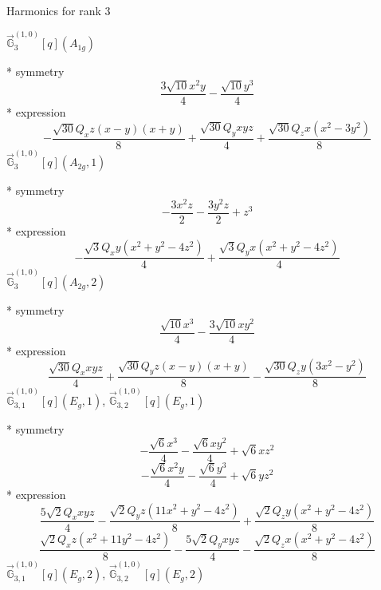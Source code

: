 \documentclass[fleqn,8pt]{jsarticle}
\begin{document}
\noindent * Harmonics for rank 3

\noindent\quad $\vec{\mathbb{G}}_{3}^{(1,0)}[q](A_{1g})$

\noindent\quad ** symmetry
\begin{dmath*}
\frac{3 \sqrt{10} x^{2} y}{4} - \frac{\sqrt{10} y^{3}}{4}
\end{dmath*}
\noindent\quad ** expression
\begin{dmath*}
- \frac{\sqrt{30} Q_{x} z \left(x - y\right) \left(x + y\right)}{8} + \frac{\sqrt{30} Q_{y} x y z}{4} + \frac{\sqrt{30} Q_{z} x \left(x^{2} - 3 y^{2}\right)}{8}
\end{dmath*}
\noindent\quad $\vec{\mathbb{G}}_{3}^{(1,0)}[q](A_{2g},1)$

\noindent\quad ** symmetry
\begin{dmath*}
- \frac{3 x^{2} z}{2} - \frac{3 y^{2} z}{2} + z^{3}
\end{dmath*}
\noindent\quad ** expression
\begin{dmath*}
- \frac{\sqrt{3} Q_{x} y \left(x^{2} + y^{2} - 4 z^{2}\right)}{4} + \frac{\sqrt{3} Q_{y} x \left(x^{2} + y^{2} - 4 z^{2}\right)}{4}
\end{dmath*}
\noindent\quad $\vec{\mathbb{G}}_{3}^{(1,0)}[q](A_{2g},2)$

\noindent\quad ** symmetry
\begin{dmath*}
\frac{\sqrt{10} x^{3}}{4} - \frac{3 \sqrt{10} x y^{2}}{4}
\end{dmath*}
\noindent\quad ** expression
\begin{dmath*}
\frac{\sqrt{30} Q_{x} x y z}{4} + \frac{\sqrt{30} Q_{y} z \left(x - y\right) \left(x + y\right)}{8} - \frac{\sqrt{30} Q_{z} y \left(3 x^{2} - y^{2}\right)}{8}
\end{dmath*}
\noindent\quad $\vec{\mathbb{G}}_{3,1}^{(1,0)}[q](E_{g},1)$, $\vec{\mathbb{G}}_{3,2}^{(1,0)}[q](E_{g},1)$

\noindent\quad ** symmetry
\begin{dmath*}
- \frac{\sqrt{6} x^{3}}{4} - \frac{\sqrt{6} x y^{2}}{4} + \sqrt{6} x z^{2}
\end{dmath*}
\begin{dmath*}
- \frac{\sqrt{6} x^{2} y}{4} - \frac{\sqrt{6} y^{3}}{4} + \sqrt{6} y z^{2}
\end{dmath*}
\noindent\quad ** expression
\begin{dmath*}
\frac{5 \sqrt{2} Q_{x} x y z}{4} - \frac{\sqrt{2} Q_{y} z \left(11 x^{2} + y^{2} - 4 z^{2}\right)}{8} + \frac{\sqrt{2} Q_{z} y \left(x^{2} + y^{2} - 4 z^{2}\right)}{8}
\end{dmath*}
\begin{dmath*}
\frac{\sqrt{2} Q_{x} z \left(x^{2} + 11 y^{2} - 4 z^{2}\right)}{8} - \frac{5 \sqrt{2} Q_{y} x y z}{4} - \frac{\sqrt{2} Q_{z} x \left(x^{2} + y^{2} - 4 z^{2}\right)}{8}
\end{dmath*}
\noindent\quad $\vec{\mathbb{G}}_{3,1}^{(1,0)}[q](E_{g},2)$, $\vec{\mathbb{G}}_{3,2}^{(1,0)}[q](E_{g},2)$
\end{document}
